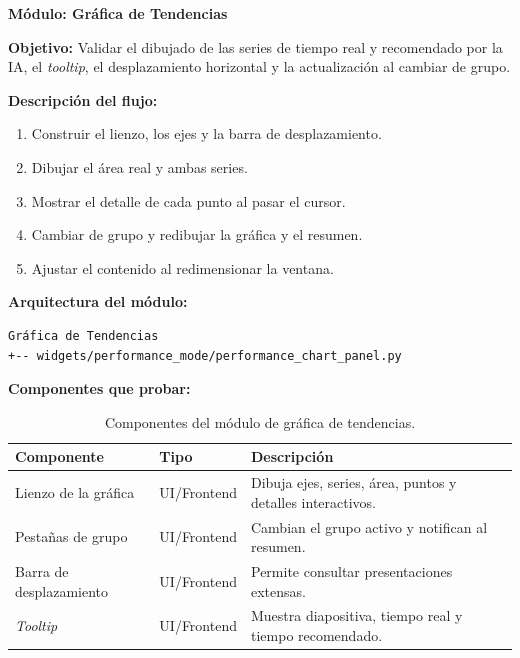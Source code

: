 \documentclass[11pt]{article}
\begin{document}
\clearpage
\textbf{Módulo: Gráfica de Tendencias}

\textbf{Objetivo:} Validar el dibujado de las series de tiempo real y recomendado por la IA, el \textit{tooltip}, el desplazamiento horizontal y la actualización al cambiar de grupo.

\textbf{Descripción del flujo:}
\begin{enumerate}
\item Construir el lienzo, los ejes y la barra de desplazamiento.
\item Dibujar el área real y ambas series.
\item Mostrar el detalle de cada punto al pasar el cursor.
\item Cambiar de grupo y redibujar la gráfica y el resumen.
\item Ajustar el contenido al redimensionar la ventana.
\end{enumerate}

\textbf{Arquitectura del módulo:}
\begin{verbatim}
Gráfica de Tendencias
+-- widgets/performance_mode/performance_chart_panel.py
\end{verbatim}

\textbf{Componentes que probar:}
\begin{table}[H]
\centering
\begin{tabular}{|L{0.30\textwidth}|L{0.16\textwidth}|L{0.44\textwidth}|}
\hline
\textbf{Componente} & \textbf{Tipo} & \textbf{Descripción} \\ \hline
Lienzo de la gráfica & UI/Frontend & Dibuja ejes, series, área, puntos y detalles interactivos. \\ \hline
Pestañas de grupo & UI/Frontend & Cambian el grupo activo y notifican al resumen. \\ \hline
Barra de desplazamiento & UI/Frontend & Permite consultar presentaciones extensas. \\ \hline
\textit{Tooltip} & UI/Frontend & Muestra diapositiva, tiempo real y tiempo recomendado. \\ \hline
\end{tabular}
\caption{Componentes del módulo de gráfica de tendencias.}
\label{tab:componentes-modulo-grafica}
\end{table}
\end{document}
